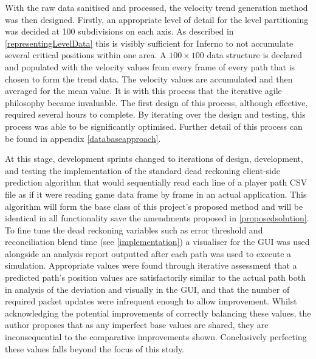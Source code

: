 \documentclass[journal]{IEEEtran}
\begin{document}
With the raw data sanitised and processed, the velocity trend generation method was then designed. Firstly, an appropriate level of detail for the level partitioning was decided at 100 subdivisions on each axis. As described in \ref{representingLevelData} this is visibly sufficient for Inferno to not accumulate several critical positions within one area. A $100 \times 100$ data structure is declared and populated with the velocity values from every frame of every path that is chosen to form the trend data. The velocity values are accumulated and then averaged for the mean value. It is with this process that the iterative agile philosophy became invaluable. The first design of this process, although effective, required several hours to complete. By iterating over the design and testing, this process was able to be significantly optimised. Further detail of this process can be found in appendix \ref{databaseapproach}.

At this stage, development sprints changed to iterations of design, development, and testing the implementation of the standard dead reckoning client-side prediction algorithm that would sequentially read each line of a player path CSV file as if it were reading game data frame by frame in an actual application. This algorithm will form the base class of this project's proposed method and will be identical in all functionality save the amendments proposed in \ref{proposedsolution}. To fine tune the dead reckoning variables such as error threshold and reconciliation blend time (see \ref{implementation}) a visualiser for the GUI was used alongside an analysis report outputted after each path was used to execute a simulation. Appropriate values were found through iterative assessment that a predicted path's position values are satisfactorily similar to the actual path both in analysis of the deviation and visually in the GUI, and that the number of required packet updates were infrequent enough to allow improvement. Whilst acknowledging the potential improvements of correctly balancing these values, the author proposes that as any imperfect base values are shared, they are inconsequential to the comparative improvements shown. Conclusively perfecting these values falls beyond the focus of this study.
\end{document}

